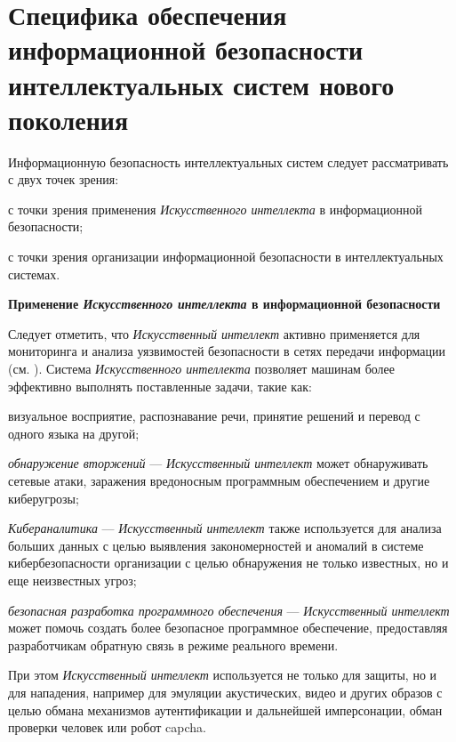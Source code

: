 \section{Специфика обеспечения информационной безопасности интеллектуальных систем нового поколения}
\label{sec_security_specifics}

Информационную безопасность интеллектуальных систем следует рассматривать с двух точек зрения:
\begin{textitemize}
	\item с точки зрения применения \textit{Искусственного интеллекта} в информационной безопасности;
	\item с точки зрения организации информационной безопасности в интеллектуальных системах.
\end{textitemize}

\textbf{Применение \textit{Искусственного интеллекта} в информационной безопасности}

Следует отметить, что \textit{Искусственный интеллект} активно применяется для мониторинга и анализа уязвимостей безопасности в сетях передачи информации (см. ). Система \textit{Искусственного интеллекта} позволяет машинам более эффективно выполнять поставленные задачи, такие как:

\begin{textitemize}
	\item визуальное восприятие, распознавание речи, принятие решений и перевод с одного языка на другой;
	
	\item \textit{обнаружение вторжений} --- \textit{Искусственный интеллект} может обнаруживать сетевые атаки, заражения вредоносным программным обеспечением и другие киберугрозы;
	
	\item \textit{Кибераналитика} --- \textit{Искусственный интеллект} также используется для анализа больших данных с целью выявления закономерностей и аномалий в системе кибербезопасности организации с целью обнаружения не только известных, но и еще неизвестных угроз;
	
	\item \textit{безопасная разработка программного обеспечения} --- \textit{Искусственный интеллект} может помочь создать более безопасное программное обеспечение, предоставляя разработчикам обратную связь в режиме реального времени.
\end{textitemize}

При этом \textit{Искусственный интеллект} используется не только для защиты, но и для нападения, например для эмуляции акустических, видео и других образов с целью обмана механизмов аутентификации и дальнейшей имперсонации, обман проверки человек или робот capcha.

